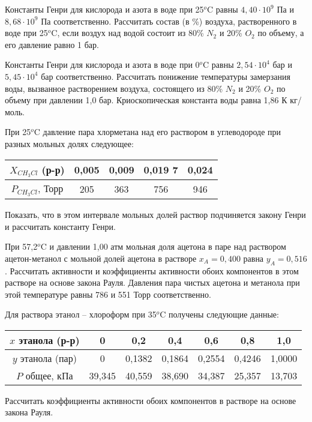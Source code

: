 \begin{Task}
Константы Генри для кислорода и азота в воде при 25$^{o}$C равны $4,40\cdot 10^{9}$ Па и $8,68\cdot 10^{9}$ Па соответственно. Рассчитать состав (в \%) воздуха, растворенного в воде при 25$^{o}$C, если воздух над водой состоит из 80\% $N_{2}$ и 20\% $O_{2}$ по объему, а его давление равно 1 бар.
\end{Task}
\begin{Task}
Константы Генри для кислорода и азота в воде при 0$^{o}$C равны $2,54\cdot 10^{4}$ бар и $5,45\cdot 10^{4}$ бар соответственно. Рассчитать понижение температуры замерзания воды, вызванное растворением воздуха, состоящего из 80\% $N_{2}$ и 20\% $O_{2}$ по объему при давлении 1,0 бар. Криоскопическая константа воды равна 1,86 К кг/моль.
\end{Task}
\begin{Task}
При 25$^{o}$C давление пара хлорметана над его раствором в углеводороде при разных мольных долях следующее:\\
\begin{tabular}{|c|c|c|c|c|}
\hline 
$X_{CH_{3}Cl}$ (р-р) & 0,005 & 0,009 & 0,019 7 & 0,024\\
\hline
$P_{CH_{3}Cl}$, Торр & 205 & 363 & 756 & 946\\
\hline
\end{tabular} 

Показать, что в этом интервале мольных долей раствор подчиняется закону Генри и рассчитать константу Генри.
\end{Task}
\begin{Task}
При 57,2$^{o}$C и давлении 1,00 атм мольная доля ацетона в паре над раствором ацетон-метанол с мольной долей ацетона в растворе $x_{A} = 0,400$ равна $y_{A} = 0,516$. Рассчитать активности и коэффициенты активности обоих компонентов в этом растворе на основе закона Рауля. Давления пара чистых ацетона и метанола при этой температуре равны 786 и 551 Торр соответственно.
\end{Task}
\begin{Task}
Для раствора этанол -- хлороформ при 35$^{o}$C получены следующие данные:\\
\begin{tabular}{|c|c|c|c|c|c|c|}
\hline 
$x$ этанола (р-р) & 0 & 0,2 & 0,4 & 0,6 & 0,8 & 1,0\\
\hline 
$y$ этанола (пар) & 0 & 0,1382 & 0,1864 & 0,2554 & 0,4246 & 1,0000\\
\hline 
$P$ общее, кПа & 39,345 & 40,559 & 38,690 & 34,387 & 25,357 & 13,703\\
\hline 
\end{tabular} 

Рассчитать коэффициенты активности обоих компонентов в растворе на основе закона Рауля.
\end{Task}
